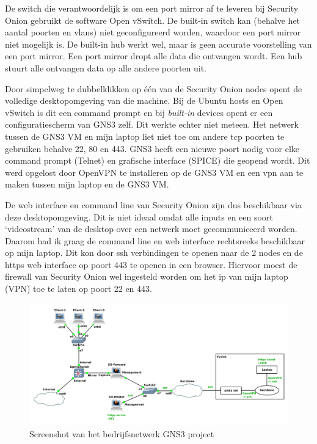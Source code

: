 \documentclass[a4paper,12pt]{report}
\begin{document}
De switch die verantwoordelijk is om een port mirror af te leveren bij Security Onion gebruikt de software Open vSwitch.
De built-in switch kan (behalve het aantal poorten en vlans) niet geconfigureerd worden, waardoor een port mirror niet mogelijk is.
De built-in hub werkt wel, maar is geen accurate voorstelling van een port mirror.
Een port mirror dropt alle data die ontvangen wordt.
Een hub stuurt alle ontvangen data op alle andere poorten uit.

Door simpelweg te dubbelklikken op één van de Security Onion nodes opent de volledige desktopomgeving van die machine.
Bij de Ubuntu hosts en Open vSwitch is dit een command prompt en bij \emph{built-in} devices opent er een configuratiescherm van GNS3 zelf.
Dit werkte echter niet meteen.
Het netwerk tussen de GNS3 VM en mijn laptop liet niet toe om andere tcp poorten te gebruiken behalve 22, 80 en 443.
GNS3 heeft een nieuwe poort nodig voor elke command prompt (Telnet) en grafische interface (SPICE) die geopend wordt.
Dit werd opgelost door OpenVPN te installeren op de GNS3 VM en een vpn aan te maken tussen mijn laptop en de GNS3 VM.

De web interface en command line van Security Onion zijn dus beschikbaar via deze desktopomgeving.
Dit is niet ideaal omdat alle inputs en een soort `videostream' van de desktop over een netwerk moet gecommuniceerd worden.
Daarom had ik graag de command line en web interface rechtsreeks beschikbaar op mijn laptop.
Dit kon door ssh verbindingen te openen naar de 2 nodes en de https web interface op poort 443 te openen in een browser.
Hiervoor moest de firewall van Security Onion wel ingesteld worden om het ip van mijn laptop (VPN) toe te laten op poort 22 en 443.

\begin{figure}[H]
  \centering
  \includegraphics[width=\textwidth]{gns3-simulatie-bedrijf}
  \caption{Screenshot van het bedrijfsnetwerk GNS3 project}
  \label{fig:gns3-simulatie-bedrijf}
\end{figure}
\end{document}
